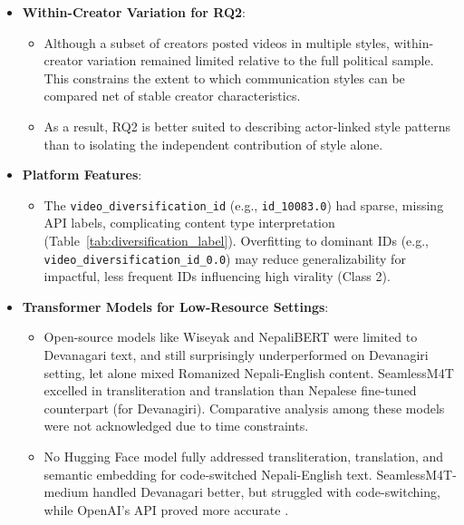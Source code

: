 \documentclass[12pt,a4paper]{report}
\begin{document}
\begin{itemize}
    \item \textbf{Within-Creator Variation for RQ2}:
        \begin{itemize}
            \item Although a subset of creators posted videos in multiple styles, within-creator variation remained limited relative to the full political sample. This constrains the extent to which communication styles can be compared net of stable creator characteristics.
            \item As a result, RQ2 is better suited to describing actor-linked style patterns than to isolating the independent contribution of style alone.
        \end{itemize}

    \item \textbf{Platform Features}:
        \begin{itemize}
            \item The \texttt{video\_diversification\_id} (e.g., \texttt{id\_10083.0}) had sparse, missing API labels, complicating content type interpretation (Table~\ref{tab:diversification_label}). Overfitting to dominant IDs (e.g., \texttt{video\_diversification\_id\_0.0}) may reduce generalizability for impactful, less frequent IDs influencing high virality (Class 2).
        \end{itemize}
\newpage
    \item \textbf{Transformer Models for Low-Resource Settings}:
        \begin{itemize}
            \item Open-source models like Wiseyak \parencite{duwal2024domainadaptativecontinuallearninglowresource} and NepaliBERT \parencite{Pudasaini2023NepaliBERT} were limited to Devanagari text, and still surprisingly underperformed on Devanagiri setting, let alone mixed Romanized Nepali-English content. SeamlessM4T \parencite{elbayad2023seamlessm4t, facebookresearch2023seamlessm4t, huggingface2024seamlessm4t} excelled in transliteration and translation than Nepalese fine-tuned counterpart (for Devanagiri). Comparative analysis among these models were not acknowledged due to time constraints.
            \item No Hugging Face model fully addressed transliteration, translation, and semantic embedding for code-switched Nepali-English text. SeamlessM4T-medium handled Devanagari better, but struggled with code-switching, while OpenAI’s API proved more accurate \parencite{reddit2023gpt4nepali}.
        \end{itemize}


\end{itemize}
\end{document}
